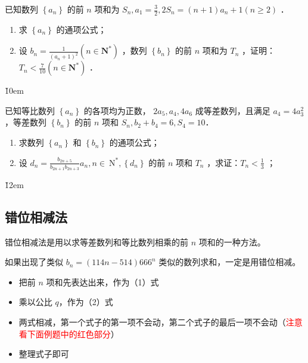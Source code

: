 \begin{example}
    已知数列 $\left\{a_n\right\}$ 的前 $n$ 项和为 $S_n, a_1=\frac{3}{2}, 2 S_n=(n+1) a_n+1(n \geqslant 2)$ ．
    \begin{enumerate}
        \item 求 $\left\{a_n\right\}$ 的通项公式；

        \item 设 $b_n=\frac{1}{\left(a_n+1\right)^2}\left(n \in \mathbf{N}^*\right)$ ，数列 $\left\{b_n\right\}$ 的前 $n$ 项和为 $T_n$ ，证明：$T_n<\frac{7}{10}\left(n \in \mathbf{N}^*\right)$ ．
    \end{enumerate}
\end{example}

\v{10em}

\begin{example}
    已知等比数列 $\left\{a_n\right\}$ 的各项均为正数， $2 a_5, a_4, 4 a_6$ 成等差数列，且满足 $a_4=4 a_3^2$ ，等差数列 $\left\{b_n\right\}$ 的前 $n$ 项和 $S_n, b_2+b_4=6, S_4=10$．
    \begin{enumerate}
        \item 求数列 $\left\{a_n\right\}$ 和 $\left\{b_n\right\}$ 的通项公式；
        \item 设 $d_n=\frac{b_{2 n+5}}{b_{2 n+1} b_{2 n+3}} a_n, n \in \mathrm{~N}^*,\left\{d_n\right\}$ 的前 $n$ 项和 $T_n$ ，求证：$T_n<\frac{1}{3}$ ；
    \end{enumerate}
\end{example}

\v{12em}

\subsection{错位相减法}

\begin{definition}[错位相减法]
    错位相减法是用以求等差数列和等比数列相乘的前 $n$ 项和的一种方法。
\end{definition}

\begin{theorem}
    如果出现了类似 $b_n = (114n-514)666^n$ 类似的数列求和，一定是用错位相减。
    \begin{itemize}
        \item 把前 $n$ 项和先表达出来，作为（1）式
        \item 乘以公比 $q$，作为（2）式
        \item 两式相减，第一个式子的第一项不会动，第二个式子的最后一项不会动（\textcolor{red}{注意看下面例题中的红色部分}）
        \item 整理式子即可
    \end{itemize}
\end{theorem}

